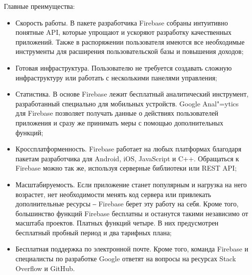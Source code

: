 Главные преимущества:
\begin{itemize}
    \item Скорость работы.
    В пакете разработчика Firebase собраны интуитивно понятные API, которые упрощают и ускоряют разработку качественных приложений.
    Также в распоряжении пользователя имеются все необходимые инструменты для расширения пользовательской базы и повышения доходов;
    \item Готовая инфраструктура.
    Пользователю не требуется создавать сложную инфраструктуру или работать с несколькими панелями управления;
    \item Статистика.
     В основе Firebase лежит бесплатный аналитический инструмент, разработанный специально для мобильных устройств.
     Google Anal"=ytics для Firebase позволяет получать данные о действиях пользователей приложения и сразу же принимать меры с помощью дополнительных функций;
    \item Кроссплатформенность.
    Firebase работает на любых платформах благодаря пакетам разработчика для Android, iOS, JavaScript и C++.
    Обращаться к Firebase можно так же, используя серверные библиотеки или REST API;
    \item Масштабируемость.
    Если приложение станет популярным и нагрузка на него возрастет, нет необходимости менять код сервера или привлекать дополнительные ресурсы ‒ Firebase берет эту работу на себя.
    Кроме того, большинство функций Firebase бесплатны и останутся такими независимо от масштаба проектов.
    Платных функций четыре. В них предусмотрен бесплатный пробный период и два тарифных плана;
    \item Бесплатная поддержка по электронной почте.
    Кроме того, команда Firebase и специалисты по разработке Google ответят на вопросы на ресурсах Stack Overflow и GitHub.
\end{itemize}
